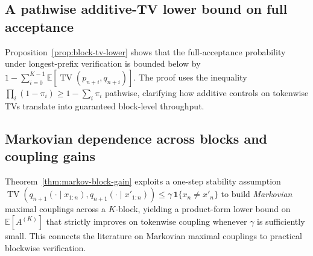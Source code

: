 \documentclass[11pt]{article}
\numberwithin{equation}{section}
\theoremstyle{plain}
\theoremstyle{definition}
\theoremstyle{remark}
\newcommand{\TV}{\operatorname{TV}}
\newcommand{\E}{\mathbb{E}}
\begin{document}


\subsection{A pathwise additive-TV lower bound on full acceptance}

Proposition~\ref{prop:block-tv-lower} shows that the full-acceptance probability under longest-prefix verification is bounded below by $1-\sum_{i=0}^{K-1}\E[\TV(p_{n+i},q_{n+i})]$. The proof uses the inequality $\prod_i(1-\pi_i)\ge 1-\sum_i\pi_i$ pathwise, clarifying how additive controls on tokenwise TVs translate into guaranteed block-level throughput.

\subsection{Markovian dependence across blocks and coupling gains}

Theorem~\ref{thm:markov-block-gain} exploits a one-step stability assumption $\TV(q_{n+1}(\cdot\mid x_{1:n}),q_{n+1}(\cdot\mid x'_{1:n}))\le \gamma\,\mathbf{1}\{x_n\ne x'_n\}$ to build \emph{Markovian} maximal couplings across a $K$-block, yielding a product-form lower bound on $\E[A^{(K)}]$ that strictly improves on tokenwise coupling whenever $\gamma$ is sufficiently small. This connects the literature on Markovian maximal couplings \cite{BanerjeeKendall2016Rigidity,Boettcher2017MMC} to practical blockwise verification.


\end{document}
